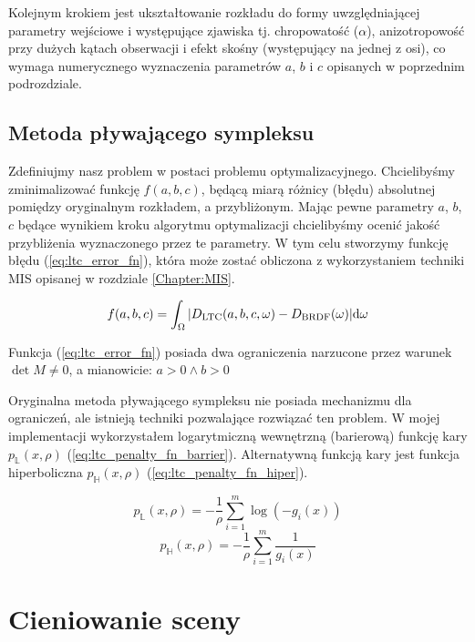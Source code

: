 \documentclass[../main.tex]{subfiles}
\begin{document}
Kolejnym krokiem jest ukształtowanie rozkładu do formy uwzględniającej parametry wejściowe i występujące zjawiska tj. chropowatość ($\alpha$), anizotropowość przy dużych kątach obserwacji i efekt skośny (występujący na jednej z osi), co wymaga numerycznego wyznaczenia parametrów $a$, $b$ i $c$ opisanych w poprzednim podrozdziale.

\subsection{Metoda pływającego sympleksu}

Zdefiniujmy nasz problem w postaci problemu optymalizacyjnego. Chcielibyśmy zminimalizować funkcję $f(a,b,c)$, będącą miarą różnicy (błędu) absolutnej pomiędzy oryginalnym rozkładem, a przybliżonym. Mając pewne parametry $a$, $b$, $c$ będące wynikiem kroku algorytmu optymalizacji chcielibyśmy ocenić jakość przybliżenia wyznaczonego przez te parametry. W tym celu stworzymy funkcję błędu (\ref{eq:ltc_error_fn}), która może zostać obliczona z wykorzystaniem techniki MIS opisanej w rozdziale \ref{Chapter:MIS}.

\begin{equation}
f(a,b,c) =
\int_{\Omega} {
    \abs{
        {D_{\text{LTC}}(a, b, c, \omega) - D_{\text{BRDF}}(\omega)}
    }
} \dd \omega
\label{eq:ltc_error_fn}
\end{equation}

Funkcja (\ref{eq:ltc_error_fn}) posiada dwa ograniczenia narzucone przez warunek $\det M \neq 0$, a mianowicie:
  $a > 0 \wedge b > 0$

Oryginalna metoda pływającego sympleksu \cite{NelderMead65} nie posiada mechanizmu dla ograniczeń, ale istnieją techniki pozwalające rozwiązać ten problem. W mojej implementacji wykorzystałem logarytmiczną wewnętrzną (barierową) funkcję kary $p_{\mathbb{L}}(x, \rho)$ (\ref{eq:ltc_penalty_fn_barrier}). Alternatywną funkcją kary jest funkcja hiperboliczna $p_{\mathbb{H}}(x, \rho)$ (\ref{eq:ltc_penalty_fn_hiper}).

\begin{equation}
  p_{\mathbb{L}}(x, \rho) = - \frac{1}{\rho} \sum_{i=1}^{m} \log(-g_i(x))
\label{eq:ltc_penalty_fn_barrier}
\end{equation}
\begin{equation}
  p_{\mathbb{H}}(x, \rho) =
    - \frac{1}{\rho} \sum_{i=1}^{m} \frac{1}{g_i(x)}
\label{eq:ltc_penalty_fn_hiper}
\end{equation}


\section{Cieniowanie sceny}
\end{document}
